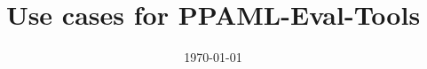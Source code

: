 \documentclass[8pt,letterpaper]{article} %
\title{Use cases for PPAML-Eval-Tools}
\date{\today}
\begin{document}
\pagestyle{empty}
\clearpage%

\newcommand{\form}[1]{{\em #1}\xspace}
\def\ptk{\form{peval-toolkit}}
\def\cp{\form{challenge problem}}
\def\tev{\form{quantitative evaluator}}
\def\lev{\form{qualitative evaluator}}
\def\rep{\form{report}}
\def\ds{\form{dataset}}
\def\ins{\form{instance}}
\def\sol{\form{solution}}
\def\gen{\form{generator}}
\def\out{\form{output}}
\def\tm{\form{team}}
\def\rn{\form{run}}
\def\eng{\form{engine}}
\def\t24{\form{TA2-4}}
\def\de{\form{domain expert}}
\def\desc{\form{INI File}}

\def\G{\form{Galois}}
\def\D{\form{DARPA}}
\def\U{\form{UNKNOWN}}
\end{document}
